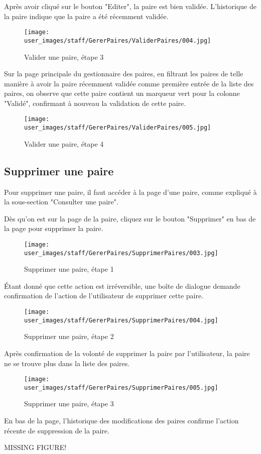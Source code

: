 Après avoir cliqué sur le bouton "Editer", la paire est bien validée. L'historique de la paire indique que la paire a été récemment validée.

\begin{figure}[H]
\centering
\texttt{[image: user\_images/staff/GererPaires/ValiderPaires/004.jpg]}
\caption{Valider une paire, étape 3}
\end{figure}

Sur la page principale du gestionnaire des paires, en filtrant les paires de telle manière à avoir la paire récemment validée comme première entrée de la liste des paires, on observe que cette paire contient un marqueur vert pour la colonne "Validé", confirmant à nouveau la validation de cette paire.

\begin{figure}[H]
\centering
\texttt{[image: user\_images/staff/GererPaires/ValiderPaires/005.jpg]}
\caption{Valider une paire, étape 4}
\end{figure}

\subsection{Supprimer une paire}

Pour supprimer une paire, il faut accéder à la page d'une paire, comme expliqué à la sous-section "Consulter une paire".\newline

Dès qu'on est sur la page de la paire, cliquez sur le bouton "Supprimer" en bas de la page pour supprimer la paire.

\begin{figure}[H]
\centering
\texttt{[image: user\_images/staff/GererPaires/SupprimerPaires/003.jpg]}
\caption{Supprimer une paire, étape 1}
\end{figure}

Étant donné que cette action est irréversible, une boîte de dialogue demande confirmation de l'action de l'utilisateur de supprimer cette paire.

\begin{figure}[H]
\centering
\texttt{[image: user\_images/staff/GererPaires/SupprimerPaires/004.jpg]}
\caption{Supprimer une paire, étape 2}
\end{figure}

Après confirmation de la volonté de supprimer la paire par l'utilisateur, la paire ne se trouve plus dans la liste des paires.

\begin{figure}[H]
\centering
\texttt{[image: user\_images/staff/GererPaires/SupprimerPaires/005.jpg]}
\caption{Supprimer une paire, étape 3}
\end{figure}

En bas de la page, l'historique des modifications des paires confirme l'action récente de suppression de la paire.

MISSING FIGURE!